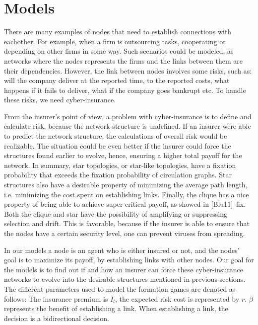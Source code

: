 \section{Models}
There are many examples of nodes that need to establish connections with eachother.
For example, when a firm is outsourcing tasks, cooperating or depending on other
firms in some way. Such scenarios could be modeled, as networks where the nodes
represents the firms and the links between them are their dependencies. However,
the link between nodes involves some risks, such as: will the company deliver at the
reported time, to the reported costs, what happens if it fails to deliver, what if the
company goes bankrupt etc. To handle these risks, we need cyber-insurance.

From the insurer’s point of view, a problem with cyber-insurance is to define and calculate risk, because the network structure is
undefined. If an insurer were able to predict the network structure, the calculations
of overall risk would be realizable. The situation could be even better if the insurer
could force the structures found earlier to evolve, hence, ensuring a higher
total payoff for the network. In summary, star topologies, or
star-like topologies, have a fixation probability that exceeds the fixation probability
of circulation graphs. Star structures also have a desirable property of minimizing the
average path length, i.e. minimizing the cost spent on establishing links. Finally, the
clique has a nice property of being able to achieve super-critical payoff, as showed in
[Blu11]--fix. Both the clique and star have the possibility of amplifying or suppressing selection and drift. This is favorable, because if the insurer is able to ensure that the nodes have a certain security level, one can prevent viruses from spreading.

In our models a node is an agent who is either insured or not, and the nodes’ goal is to maximize its payoff, by establishing links with other nodes. Our goal for the models is to find out if and how an insurer can force these cyber-insurance networks to evolve into the desirable structures mentioned in previous sections.
The different parameters used to model the formation games are denoted as follows: The insurance premium is $I_{l}$, the expected risk cost is represented by $r$. $\beta$ represents the benefit of establishing a link. When establishing a link, the decision is a bidirectional decision.  
 
